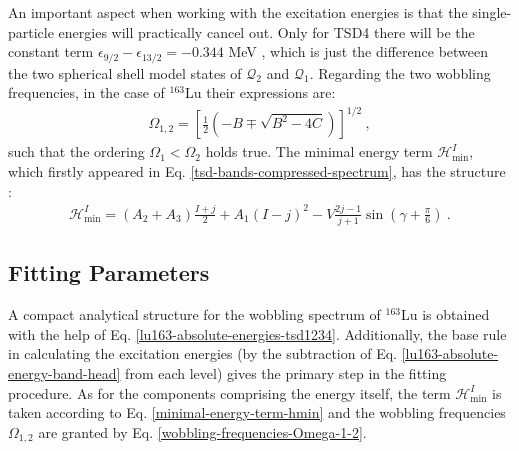 An important aspect when working with the excitation energies is that the single-particle energies will practically cancel out. Only for TSD4 there will be the constant term $\epsilon_{9/2}-\epsilon_{13/2}=-0.344$ MeV \cite{raduta2020towards}, which is just the difference between the two spherical shell model states of $\mathcal{Q}_2$ and $\mathcal{Q}_1$. Regarding the two wobbling frequencies, in the case of $^{163}$Lu their expressions are:
\begin{align}
    \Omega_{1,2}=\left[\frac{1}{2}\left(-B\mp\sqrt{B^2-4C}\right)\right]^{1/2}\ ,
    \label{wobbling-frequencies-Omega-1-2}
\end{align}
such that the ordering $\Omega_1<\Omega_2$ holds true. The minimal energy term $\mathcal{H}_\text{min}^I$, which firstly appeared in Eq. \ref{tsd-bands-compressed-spectrum}, has the structure \cite{poenaru2021extensive1}:
\begin{align}
    \mathcal{H}_\text{min}^I=\left(A_2+A_3\right)\frac{I+j}{2}+A_1(I-j)^2-V\frac{2j-1}{j+1}\sin\left(\gamma+\frac{\pi}{6}\right)\ .
    \label{minimal-energy-term-hmin}
\end{align}

\subsection{Fitting Parameters}

A compact analytical structure for the wobbling spectrum of $^{163}$Lu is obtained with the help of Eq. \ref{lu163-absolute-energies-tsd1234}. Additionally, the base rule in calculating the excitation energies (by the subtraction of Eq. \ref{lu163-absolute-energy-band-head} from each level) gives the primary step in the fitting procedure. As for the components comprising the energy itself, the term $\mathcal{H}_\text{min}^I$ is taken according to Eq. \ref{minimal-energy-term-hmin} and the wobbling frequencies $\Omega_{1,2}$ are granted by Eq. \ref{wobbling-frequencies-Omega-1-2}. 

